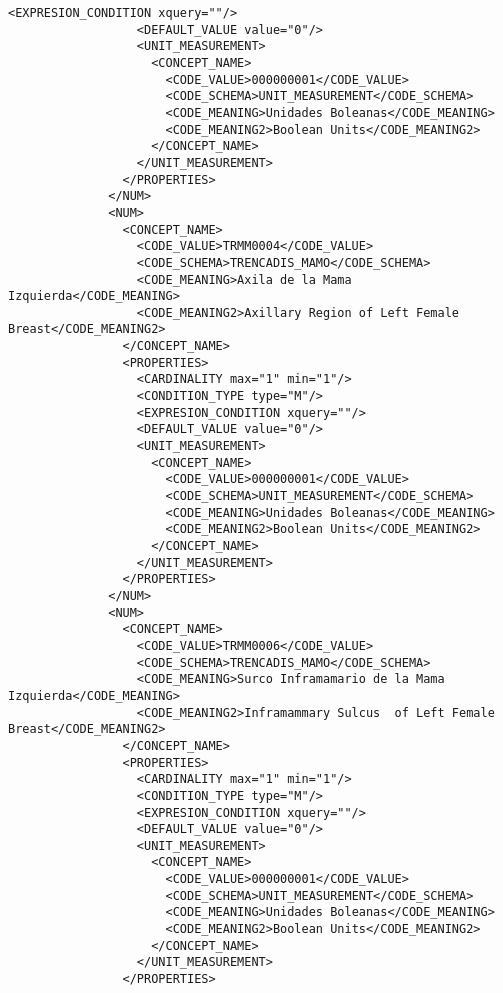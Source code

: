 \begin{lstlisting}[label=dicom-report,caption=Informe estructurado de una exploración de mama]
                  <EXPRESION_CONDITION xquery=""/>
                  <DEFAULT_VALUE value="0"/>
                  <UNIT_MEASUREMENT>
                    <CONCEPT_NAME>
                      <CODE_VALUE>000000001</CODE_VALUE>
                      <CODE_SCHEMA>UNIT_MEASUREMENT</CODE_SCHEMA>
                      <CODE_MEANING>Unidades Boleanas</CODE_MEANING>
                      <CODE_MEANING2>Boolean Units</CODE_MEANING2>
                    </CONCEPT_NAME>
                  </UNIT_MEASUREMENT>
                </PROPERTIES>
              </NUM>
              <NUM>
                <CONCEPT_NAME>
                  <CODE_VALUE>TRMM0004</CODE_VALUE>
                  <CODE_SCHEMA>TRENCADIS_MAMO</CODE_SCHEMA>
                  <CODE_MEANING>Axila de la Mama Izquierda</CODE_MEANING>
                  <CODE_MEANING2>Axillary Region of Left Female Breast</CODE_MEANING2>
                </CONCEPT_NAME>
                <PROPERTIES>
                  <CARDINALITY max="1" min="1"/>
                  <CONDITION_TYPE type="M"/>
                  <EXPRESION_CONDITION xquery=""/>
                  <DEFAULT_VALUE value="0"/>
                  <UNIT_MEASUREMENT>
                    <CONCEPT_NAME>
                      <CODE_VALUE>000000001</CODE_VALUE>
                      <CODE_SCHEMA>UNIT_MEASUREMENT</CODE_SCHEMA>
                      <CODE_MEANING>Unidades Boleanas</CODE_MEANING>
                      <CODE_MEANING2>Boolean Units</CODE_MEANING2>
                    </CONCEPT_NAME>
                  </UNIT_MEASUREMENT>
                </PROPERTIES>
              </NUM>
              <NUM>
                <CONCEPT_NAME>
                  <CODE_VALUE>TRMM0006</CODE_VALUE>
                  <CODE_SCHEMA>TRENCADIS_MAMO</CODE_SCHEMA>
                  <CODE_MEANING>Surco Inframamario de la Mama Izquierda</CODE_MEANING>
                  <CODE_MEANING2>Inframammary Sulcus  of Left Female Breast</CODE_MEANING2>
                </CONCEPT_NAME>
                <PROPERTIES>
                  <CARDINALITY max="1" min="1"/>
                  <CONDITION_TYPE type="M"/>
                  <EXPRESION_CONDITION xquery=""/>
                  <DEFAULT_VALUE value="0"/>
                  <UNIT_MEASUREMENT>
                    <CONCEPT_NAME>
                      <CODE_VALUE>000000001</CODE_VALUE>
                      <CODE_SCHEMA>UNIT_MEASUREMENT</CODE_SCHEMA>
                      <CODE_MEANING>Unidades Boleanas</CODE_MEANING>
                      <CODE_MEANING2>Boolean Units</CODE_MEANING2>
                    </CONCEPT_NAME>
                  </UNIT_MEASUREMENT>
                </PROPERTIES>

\end{lstlisting}
